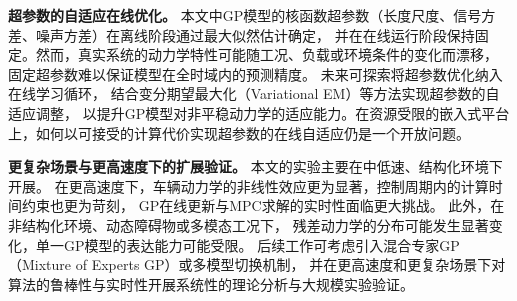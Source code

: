 \textbf{超参数的自适应在线优化。}
本文中GP模型的核函数超参数（长度尺度、信号方差、噪声方差）在离线阶段通过最大似然估计确定，
并在在线运行阶段保持固定。然而，真实系统的动力学特性可能随工况、负载或环境条件的变化而漂移，
固定超参数难以保证模型在全时域内的预测精度。
未来可探索将超参数优化纳入在线学习循环，
结合变分期望最大化（Variational EM）等方法实现超参数的自适应调整，
以提升GP模型对非平稳动力学的适应能力。在资源受限的嵌入式平台上，如何以可接受的计算代价实现超参数的在线自适应仍是一个开放问题。

\textbf{更复杂场景与更高速度下的扩展验证。}
本文的实验主要在中低速、结构化环境下开展。
在更高速度下，车辆动力学的非线性效应更为显著，控制周期内的计算时间约束也更为苛刻，
GP在线更新与MPC求解的实时性面临更大挑战。
此外，在非结构化环境、动态障碍物或多模态工况下，
残差动力学的分布可能发生显著变化，单一GP模型的表达能力可能受限。
后续工作可考虑引入混合专家GP（Mixture of Experts GP）或多模型切换机制，
并在更高速度和更复杂场景下对算法的鲁棒性与实时性开展系统性的理论分析与大规模实验验证。